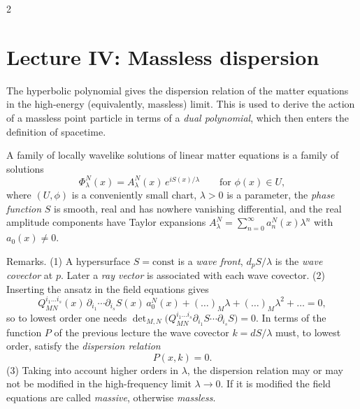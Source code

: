 \begin{paracol}{2}
\section{Lecture IV: Massless dispersion}\label{sec:c29-L4}

 The hyperbolic polynomial gives the dispersion relation of the matter equations in the high-energy (equivalently, massless) limit. This is used to derive the action of a massless point particle in terms of a \emph{dual polynomial}, which then enters the definition of spacetime.

\begin{definition}\label{def:c29-wavelike}
A family of locally wavelike solutions of linear matter equations is a family of solutions
\[
  \Phi^N_\lambda(x)=A^N_\lambda(x)\,e^{iS(x)/\lambda}\qquad\text{for }\phi(x)\in U,
\]
where $(U,\phi)$ is a conveniently small chart, $\lambda>0$ is a parameter, the \emph{phase function} $S$ is smooth, real and has nowhere vanishing differential, and the real amplitude components have Taylor expansions $A^N_\lambda=\sum_{n=0}^\infty a^N_n(x)\lambda^n$ with $a_0(x)\ne0$.
\end{definition}

Remarks. (1) A hypersurface $S=\text{const}$ is a \emph{wave front}, $d_pS/\lambda$ is the \emph{wave covector} at $p$. Later a \emph{ray vector} is associated with each wave covector. (2) Inserting the ansatz in the field equations gives
\[
  Q_{MN}^{i_1\dots i_s}(x)\,\partial_{i_1}\cdots\partial_{i_s}S(x)\,a^N_0(x)+(\dots)_M\lambda+(\dots)_M\lambda^2+\dots=0,
\]
so to lowest order one needs $\det_{M,N}\bigl(Q_{MN}^{i_1\dots i_s}\partial_{i_1}S\cdots\partial_{i_s}S\bigr)=0$. In terms of the function $P$ of the previous lecture the wave covector $k=dS/\lambda$ must, to lowest order, satisfy the \emph{dispersion relation}
\[
  P(x,k)=0.
\]
(3) Taking into account higher orders in $\lambda$, the dispersion relation may or may not be modified in the high-frequency limit $\lambda\to0$. If it is modified the field equations are called \emph{massive}, otherwise \emph{massless}.


\end{paracol}
